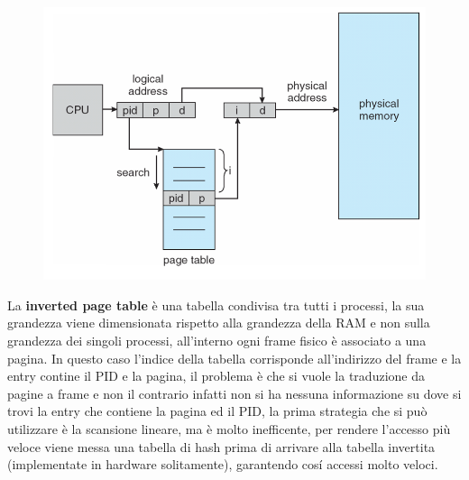 \documentclass[12pt]{article}
\begin{document}
\begin{figure}
  \centering
  \includegraphics[width=1\linewidth]{inverted-page-table.png}
\end{figure}
La \textbf{inverted page table} \`e una tabella condivisa tra tutti i processi, la sua grandezza viene dimensionata rispetto alla grandezza della RAM e non sulla grandezza dei singoli processi, all'interno ogni frame fisico \`e associato a una pagina. In questo caso l'indice della tabella corrisponde all'indirizzo del frame e la entry contine il PID e la pagina, il problema \`e che si vuole la traduzione da pagine a frame e non il contrario infatti non si ha nessuna informazione su dove si trovi la entry che contiene la pagina ed il PID, la prima strategia che si pu\`o utilizzare \`e la scansione lineare, ma \`e molto inefficente, per rendere l'accesso pi\`u veloce viene messa una tabella di hash prima di arrivare alla tabella invertita (implementate in hardware solitamente), garantendo cos\'i accessi molto veloci.
\end{document}
